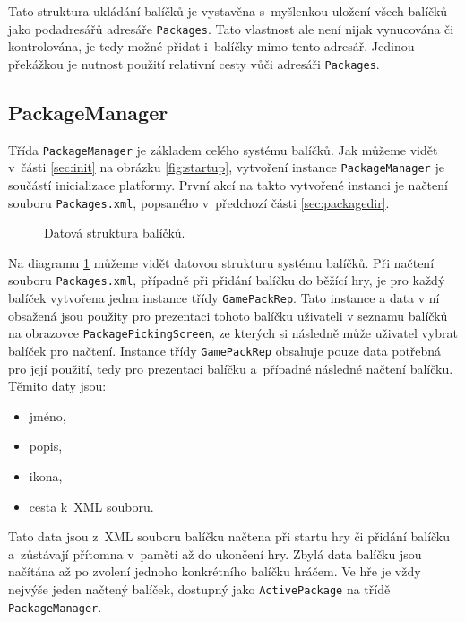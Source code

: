 Tato struktura ukládání balíčků je vystavěna s~myšlenkou uložení všech balíčků jako podadresářů adresáře \texttt{Packages}. Tato vlastnost ale není nijak vynucována či kontrolována, je tedy možné přidat i~balíčky mimo tento adresář. Jedinou překážkou je nutnost použití relativní cesty vůči adresáři \texttt{Packages}.

\subsection{PackageManager}
\label{sec:packagemanager}
Třída \texttt{PackageManager} je základem celého systému balíčků. Jak můžeme vidět v~části \ref{sec:init} na obrázku \ref{fig:startup}, vytvoření instance \texttt{PackageManager} je součástí inicializace platformy. První akcí na takto vytvořené instanci je načtení souboru \texttt{Packages.xml}, popsaného v~předchozí části \ref{sec:packagedir}.

\begin{figure}[h]
	\centering
	\fontsize{8pt}{11pt}\selectfont
	\def\svgwidth{\textwidth}
	
	\caption{Datová struktura balíčků.}
	\label{fig:packagemanager}
\end{figure}

Na diagramu \ref{fig:packagemanager} můžeme vidět datovou strukturu systému balíčků. Při načtení souboru \texttt{Packages.xml}, případně při přidání balíčku do běžící hry, je pro každý balíček vytvořena jedna instance třídy \texttt{GamePackRep}. Tato instance a data v ní obsažená jsou použity pro prezentaci tohoto balíčku uživateli v seznamu balíčků na obrazovce \texttt{PackagePickingScreen}, ze kterých si následně může uživatel vybrat balíček pro načtení. Instance třídy \texttt{GamePackRep} obsahuje pouze data potřebná pro její použití, tedy pro prezentaci balíčku a~případné následné načtení balíčku. Těmito daty jsou:

\begin{itemize}
	\item jméno,
	\item popis,
	\item ikona,
	\item cesta k~XML souboru.
\end{itemize}

Tato data jsou z~XML souboru balíčku načtena při startu hry či přidání balíčku a~zůstávají přítomna v~paměti až do ukončení hry. Zbylá data balíčku jsou načítána až po zvolení jednoho konkrétního balíčku hráčem. Ve hře je vždy nejvýše jeden načtený balíček, dostupný jako \texttt{ActivePackage} na třídě \texttt{PackageManager}.

